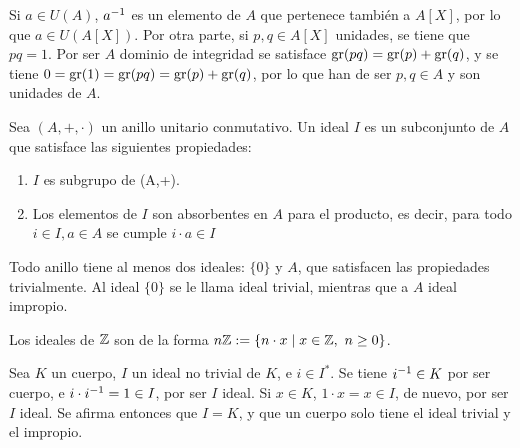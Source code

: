 \begin{prop}\label{unidades_de_A_y_A[X]}
\end{prop}

\begin{dem}{\cite[p.~119]{GamboaAnillos}}
Si $a\in U(A)$, $a^{-1}$ es un elemento de $A$ que pertenece también a $A[X]$, por lo que $a \in U(A[X])$. Por otra parte, si $p,q \in A[X]$ unidades, se tiene que $pq = 1$. Por ser $A$ dominio de integridad se satisface $\text{gr}(pq) = \text{gr}(p) + \text{gr}(q)$, y se tiene $0 = \text{gr}(1) = \text{gr}(pq) = \text{gr}(p) + \text{gr}(q)$, por lo que han de ser $p,q \in A$ y son unidades de $A$.
\end{dem}




\begin{deff}[Ideal]{\cite[p.~25]{GamboaAnillos}}
    Sea $(A,+,\cdot)$ un anillo unitario conmutativo. Un ideal $I$ es un subconjunto de $A$ que satisface las siguientes propiedades:
    \begin{enumerate}[label=\roman*)]
        \item $I$ es subgrupo de (A,+).
        \item Los elementos de $I$ son absorbentes en $A$ para el producto, es decir, para todo $i \in I, a\in A$ se cumple $i\cdot a \in I$
    \end{enumerate}
\end{deff}

\begin{obs}
    Todo anillo tiene al menos dos ideales: $\{0\}$ y $A$, que satisfacen las propiedades trivialmente. Al ideal $\{0\}$ se le llama ideal trivial, mientras que a $A$ ideal impropio.
\end{obs}

\begin{ejs}
    \item Los ideales de $\mathbb{Z}$ son de la forma $n\mathbb{Z}:= \{ n \cdot x\mid x\in\mathbb{Z}, \ n\geq 0\}$.

    \item Sea $K$ un cuerpo, $I$ un ideal no trivial de $K$, e $i\in I^*$. Se tiene $i^{-1}\in K$ por ser cuerpo, e $i \cdot i^{-1}  = 1\in I$, por ser $I$ ideal. Si $x \in K$, $1\cdot x = x \in I$, de nuevo, por ser $I$ ideal. Se afirma entonces que  $I = K$, y que un cuerpo solo tiene el ideal trivial y el impropio.

    
\end{ejs}



